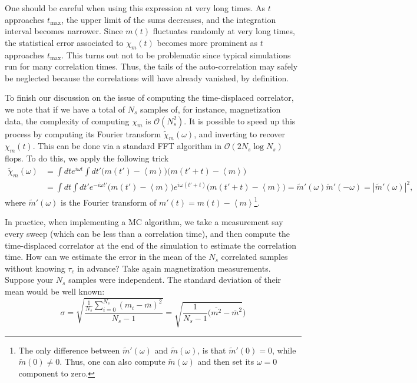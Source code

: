 One should be careful when using this expression at very long times.
As $t$ approaches $t_{\text{max}}$, the upper limit of the sums decreases, and the integration interval becomes narrower.
Since $m (t)$ fluctuates randomly at very long times, the statistical error associated to $\chi_m (t)$ becomes more prominent as $t$ approaches $t_{\text{max}}$.
This turns out not to be problematic since typical simulations run for many correlation times.
Thus, the tails of the auto-correlation may safely be neglected because the correlations will have already vanished, by definition.

To finish our discussion on the issue of computing the time-displaced correlator, we note that if we have a total of $N_s$ samples of, for instance, magnetization data, the complexity of computing $\chi_m$ is $\mathcal{O}(N_s^2)$.
It is possible to speed up this process by computing its Fourier transform $\tilde{\chi}_m(\omega)$, and inverting to recover $\chi_m (t)$.
This can be done via a standard \ac{FFT} algorithm in $\mathcal{O}(2 N_s \log N_s )$ flops.
To do this, we apply the following trick
\begin{equation}
\begin{split}
\tilde{\chi}_m ( \omega ) &= \int dt e^{i\omega t} \int dt' \bigg( m ( t' ) - \left\langle m \right\rangle \bigg) \bigg( m ( t' + t ) - \left\langle m \right\rangle \bigg) \\
&= \int dt \int dt' e^{-i\omega t'} \bigg( m ( t' ) - \left\langle m \right\rangle \bigg) e^{i\omega ( t' + t )} \bigg( m ( t' + t ) - \left\langle m \right\rangle \bigg) = \tilde{m}' (\omega) \tilde{m}' (- \omega) = | \tilde{m}' (\omega) |^2 ,
\end{split} 
\end{equation}
where $\tilde{m}' (\omega)$ is the Fourier transform of $m' (t) = m(t) - \left\langle m \right\rangle$\footnote{The only difference between $\tilde{m}' (\omega)$ and $\tilde{m} (\omega)$, is that $\tilde{m}' (0) = 0$, while $\tilde{m} (0) \neq 0$. Thus, one can also compute $\tilde{m} (\omega)$ and then set its $\omega = 0$ component to zero.}.

In practice, when implementing a MC algorithm, we take a measurement say every sweep (which can be less than a correlation time), and then compute the time-displaced correlator at the end of the simulation to estimate the correlation time.
How can we estimate the error in the mean of the $N_s$ correlated samples without knowing $\tau_c$ in advance?
Take again magnetization measurements.
Suppose your $N_s$ samples were  independent.
The standard deviation of their mean would be well known:
\begin{equation}\label{eq:errorUncorr}
\sigma = \sqrt{ \frac{ \frac{1}{N_s} \sum_{i=0}^{N_s} ( m_i - \overline{m} )^2 }{N_s - 1} } = \sqrt{ \frac{1}{N_s - 1} ( \overline{m^2} - \overline{m}^2 } )
\end{equation}

